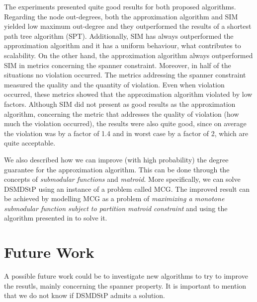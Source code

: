 The experiments presented quite good results for both proposed algorithms. Regarding the node out-degrees, both the approximation algorithm and SIM yielded low
maximum out-degree and they outperformed the results of a shortest path tree algorithm (SPT). Additionally, SIM has always outperformed the approximation algorithm 
and it has a uniform behaviour, what contributes to scalability. 
On the other hand, the approximation algorithm always outperformed SIM in metrics concerning the spanner constraint. Moreover, in half of the situations 
no violation occurred. The metrics addressing the spanner constraint measured the quality and the quantity of violation. Even when violation occurred, 
these metrics showed that the approximation algorithm violated by low factors. 
Although SIM did not present as good results as the approximation algorithm, 
concerning the metric that addresses the quality of violation (how much the violation occurred), the results were also 
quite good, since on average the violation was by a factor of 1.4 and in worst case by a factor of 2, which are quite acceptable.


We also described how we can improve (with high probability) the degree guarantee for the approximation algorithm. This can be done through the concepts of \emph{submodular functions} 
and \emph{matroid}. More specifically, we can solve DSMDStP using an instance of a problem called MCG. 
The improved result can be achieved by modelling MCG as a problem of \emph{maximizing a monotone submodular function subject to partition matroid constraint} and using the algorithm presented in \cite{Calinescu2011} to solve it. 

\section{Future Work}

A possible future work could be to investigate new algorithms to try to improve the resutls, mainly concerning the spanner property. It is important to mention that 
we do not know if DSMDStP admits a solution.

